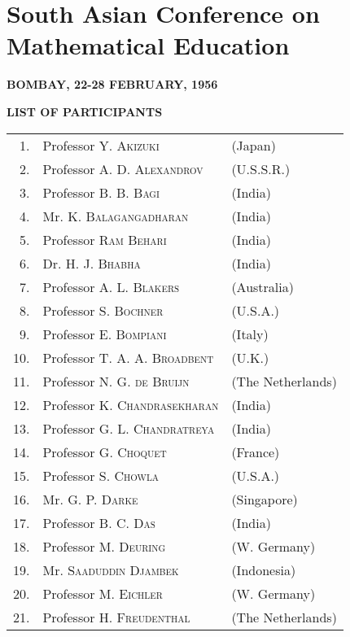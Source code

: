 \chapter{South Asian Conference on Mathematical Education}

\begin{center}
{\bf BOMBAY, 22-28 FEBRUARY, 1956}
\medskip

{\large\bf LIST OF PARTICIPANTS}
\end{center}

\setcounter{pageoriginal}{180}
\pageoriginale
\renewcommand{\arraystretch}{1.23}
\begin{longtable}[l]{r@{\;\,}ll}
1. & Professor \textsc{Y. Akizuki} & (Japan)\\
2. & Professor \textsc{A. D. Alexandrov} & (U.S.S.R.)\\
3. & Professor \textsc{B. B. Bagi} & (India)\\
4. & Mr. \textsc{K. Balagangadharan} & (India)\\
5. & Professor \textsc{Ram Behari} & (India)\\
6. & Dr. \textsc{H. J. Bhabha} & (India)\\
7. & Professor \textsc{A. L. Blakers} & (Australia)\\
8. & Professor \textsc{S. Bochner} & (U.S.A.)\\
9. & Professor \textsc{E. Bompiani} & (Italy)\\
10. & Professor \textsc{T. A. A. Broadbent} & (U.K.)\\
11. & Professor \textsc{N. G. de Bruijn} & (The Netherlands)\\
12. & Professor \textsc{K. Chandrasekharan} & (India)\\
13. & Professor \textsc{G. L. Chandratreya} & (India)\\
14. & Professor \textsc{G. Choquet} & (France)\\
15. & Professor \textsc{S. Chowla} & (U.S.A.)\\
16. & Mr. \textsc{G. P. Darke} & (Singapore)\\
17. & Professor \textsc{B. C. Das} & (India)\\
18. & Professor \textsc{M. Deuring} & (W. Germany)\\
19. & Mr. \textsc{Saaduddin Djambek} & (Indonesia)\\
20. & Professor \textsc{M. Eichler} & (W. Germany)\\
21. & Professor \textsc{H. Freudenthal} & (The Netherlands)\\

\end{longtable}

